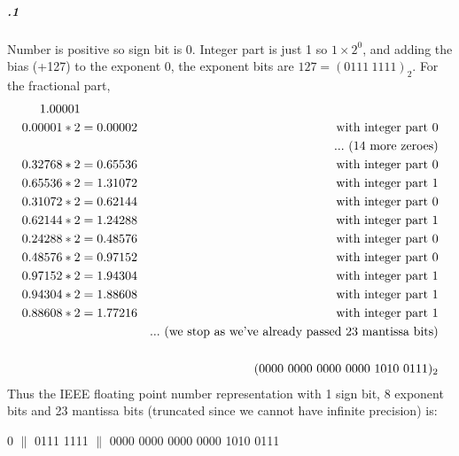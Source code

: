 \documentclass[11pt,letterpaper]{article}
\begin{document}
		\subparagraph{.1}
		Number is positive so sign bit is 0.
		Integer part is just 1 so $1 \times 2^0$, and adding the bias (+127) to the exponent 0, the exponent bits are $127 = (0111\ 1111)_{2}$.
		For the fractional part,
		\begin{align*}
		1.00001\\
		0.00001 * 2 &= 0.00002&\textnormal{with integer part 0}\\
		&&...\textnormal{ (14 more zeroes)}\\
		0.32768 * 2 &= 0.65536&\textnormal{with integer part 0}\\
		0.65536 * 2 &= 1.31072&\textnormal{with integer part 1}\\
		0.31072 * 2 &= 0.62144&\textnormal{with integer part 0}\\
		0.62144 * 2 &= 1.24288&\textnormal{with integer part 1}\\
		0.24288 * 2 &= 0.48576&\textnormal{with integer part 0}\\
		0.48576 * 2 &= 0.97152&\textnormal{with integer part 0}\\
		0.97152 * 2 &= 1.94304&\textnormal{with integer part 1}\\
		0.94304 * 2 &= 1.88608&\textnormal{with integer part 1}\\
		0.88608 * 2 &= 1.77216&\textnormal{with integer part 1}\\
		&&...\textnormal{ (we stop as we've already passed 23 mantissa bits)}\\
		\\
		&&(0000\ 0000\ 0000\ 0000\ 1010\ 0111)_2
		\end{align*}
		Thus the IEEE floating point number representation with 1 sign bit, 8 exponent bits and 23 mantissa bits (truncated since we cannot have infinite precision) is:
		\begin{center}
		0 $\|$ 0111 1111 $\|$ 0000 0000 0000 0000 1010 0111
		\end{center}
		
\end{document}
